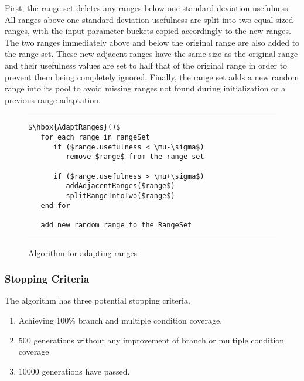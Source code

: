 \documentclass[runningheads]{llncs}
\begin{document}
First, the range set deletes any ranges below one standard deviation usefulness. All ranges above one standard deviation usefulness are split into two equal sized ranges, with the input parameter buckets copied accordingly to the new ranges. The two ranges immediately above and below the original range are also added to the range set. These new adjacent ranges have the same size as the original range and their usefulness values are set to half that of the original range in order to prevent them being completely ignored. Finally, the range set adds a new random range into its pool to avoid missing ranges not found during initialization or a previous range adaptation.

\begin{figure}[h!]
\begin{center}
\hrule
\medskip
\begin{Verbatim}[fontfamily=tt, xleftmargin=10pt, commandchars=\\\{\},
   codes={\catcode`$=3\catcode`^=7\catcode`_=8}]
$\hbox{AdaptRanges}()$    
   for each range in rangeSet
      if ($range.usefulness < \mu-\sigma$)
         remove $range$ from the range set
      
      if ($range.usefulness > \mu+\sigma$)
         addAdjacentRanges($range$)
         splitRangeIntoTwo($range$)  
   end-for
   
   add new random range to the RangeSet
\end{Verbatim}
\hrule
\end{center}
\caption{Algorithm for adapting ranges \label{fig:adptRang}}
\end{figure}
\FloatBarrier

\subsubsection{Stopping Criteria}
The algorithm has three potential stopping criteria. 
\begin{enumerate}
	\item Achieving 100\% branch and multiple condition coverage. 
	\item 500 generations without any improvement of branch or multiple condition coverage
	\item 10000 generations have passed.
\end{enumerate}

\begin{comment}
Maybe this should be called Summary or 'Algorithm Summary' so the reader doesnt think its the actual conclusion
\end{comment}
\end{document}
